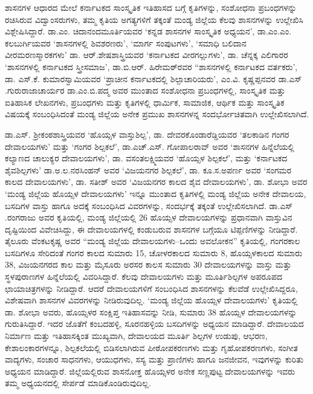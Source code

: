 ಶಾಸನಗಳ ಆಧಾರದ ಮೇಲೆ ಕರ್ನಾಟಕದ ಸಾಂಸ್ಕೃತಿಕ ಇತಿಹಾಸದ ಬಗ್ಗೆ ಕೃತಿಗಳನ್ನು, ಸಂಶೋಧನಾ ಪ್ರಬಂಧಗಳನ್ನು ರಚಿಸಿರುವ ವಿದ್ವಾಂಸರುಗಳು, ತಮ್ಮ ಕೃತಿಯ ಅಗತ್ಯಗಳಿಗೆ ತಕ್ಕಂತೆ ಮಂಡ್ಯ ಜಿಲ್ಲೆಯ ಕೆಲವು ಶಾಸನಗಳನ್ನು ಉಲ್ಲೇಖಿಸಿ ವಿಶ್ಲೇಷಿಸಿದ್ದಾರೆ. ಡಾ.ಎಂ. ಚಿದಾನಂದಮೂರ್ತಿಯವರ ‘ಕನ್ನಡ ಶಾಸನಗಳ ಸಾಂಸ್ಕೃತಿಕ ಅಧ್ಯಯನ’, ಡಾ.ಎಂ.ಎಂ. ಕಲಬುರ್ಗಿಯವರ ‘ಶಾಸನಗಳಲ್ಲಿ ಶಿವಶರಣರು’, ‘ಮಾರ್ಗ ಸಂಪುಟಗಳು’, ‘ಸಮಾಧಿ ಬಲಿದಾನ ವೀರಮರಣಸ್ಮಾರಕಗಳು’ ಡಾ. ಆರ್​.\break ಶೇಷಶಾಸ್ತ್ರಿಯವರ ‘ಕರ್ನಾಟಕದ ವೀರಗಲ್ಲುಗಳು’, ಡಾ. ಚೆನ್ನಕ್ಕ ಎಲಿಗಾರರ ‘ಶಾಸನಗಳಲ್ಲಿ ಕರ್ನಾಟಕದ ಸ್ತ್ರೀಸಮಾಜ’, ಡಾ.ಬಿ.ಆರ್​. ಹಿರೇಮಠ್​ರವರ “ಶಾಸನಗಳಲ್ಲಿ ಕರ್ನಾಟಕದ ವರ್ತಕರು’, ಡಾ. ಎಸ್​.ಕೆ. ಕುಮಾರಸ್ವಾಮಿಯವರ ‘ಪ್ರಾಚೀನ ಕರ್ನಾಟಕದಲ್ಲಿ ಶಿಲ್ಪಾಚಾರಿಯರು’, ಎಂ.ವಿ. ಕೃಷ್ಣಪ್ಪನವರ  ಡಾ.ಎಸ್​.ಗುರುರಾಜಾಚಾರ್ಯರ  ಡಾ.ಎಂ.ಬಿ.ಪದ್ಮ ಅವರ  ಮುಂತಾದ ಸಂಶೋಧನಾ ಪ್ರಬಂಧಗಳಲ್ಲಿ, ಸಾಂಸ್ಕೃತಿಕ ಮತ್ತು ಐತಿಹಾಸಿಕ ಲೇಖನಗಳು, ಪ್ರಬಂಧಗಳು ಮತ್ತು ಕೃತಿಗಳಲ್ಲಿ ಧಾರ್ಮಿಕ, ಸಾಮಾಜಿಕ, ಆರ್ಥಿಕ ಮತ್ತು ಸಾಂಸ್ಕೃತಿಕ ವಿಷಯಕ್ಕೆ ಸಂಬಂಧಿಸಿದಂತೆ ಮಂಡ್ಯ ಜಿಲ್ಲೆಯ ಅನೇಕ ಪ್ರಮುಖ ಶಾಸನಗಳನ್ನ ಸಂದರ್ಭೋಚಿತವಾಗಿ ಉಲ್ಲೇಖಿಸಲಾಗಿದೆ.

ಡಾ.ಎಸ್​. ಶ‍್ರೀಕಂಠಶಾಸ್ತ್ರಿಯವರ ‘ಹೊಯ್ಸಳ ವಾಸ್ತುಶಿಲ್ಪ’, ಡಾ. ದೇವರಕೊಂಡಾರೆಡ್ಡಿಯವರ ‘ತಲಕಾಡಿನ ಗಂಗರ ದೇವಾಲಯಗಳು’ ಮತ್ತು ‘ಗಂಗರ ಶಿಲ್ಪಕಲೆ’, ಡಾ.ಎಚ್​.ಎಸ್​. ಗೋಪಾಲರಾವ್​ ಅವರ ‘ಶಾಸನಗಳ ಹಿನ್ನೆಲೆಯಲ್ಲಿ ಕಲ್ಯಾಣದ ಚಾಲುಕ್ಯರ ದೇವಾಲಯಗಳು’, ಡಾ. ವಸಂತಲಕ್ಷ್ಮಿಯವರ ‘ಹೊಯ್ಸಳ ಶಿಲ್ಪಕಲೆ’, ಮತ್ತು ‘ಕರ್ನಾಟಕದ ಶೈವಶಿಲ್ಪಗಳು’ ಡಾ.ಅ.ಲ.ನರಸಿಂಹನ್​ ಅವರ ‘ವಿಜಯನಗರ ಶಿಲ್ಪಕಲೆ’, ಡಾ. ಕೂ.ಸ.ಅಪರ್ಣ ಅವರ ‘ಸಂಗಮರ ಕಾಲದ ದೇವಾಲಯಗಳು’, ಡಾ. ಸತೀಶ್​ ಅವರ ‘ವಿಜಯನಗರ ಕಾಲದ ಶೈವ ದೇವಾಲಯಗಳು’, ಡಾ. ಶೋಭಾ ಅವರ ‘ಮಂಡ್ಯ ಜಿಲ್ಲೆಯ ಹೊಯ್ಸಳ ದೇವಾಲಯಗಳು’ ಇನ್ನೂ ಮುಂತಾದ ಕೃತಿಗಳಲ್ಲಿ ಮಂಡ್ಯ ಜಿಲ್ಲೆಯ ಅನೇಕ ದೇವಾಲಯ, ಬಸದಿಗಳ ವಾಸ್ತು ಹಾಗೂ ಅದಕ್ಕೆ ಸಂಬಂಧಿಸಿದ ವಿವರಗಳನ್ನು, ಸಂದರ್ಭಕ್ಕೆ ತಕ್ಕಂತೆ ಉಲ್ಲೇಖಿಸಲಾಗಿದೆ. ಡಾ.ಎಸ್​.ರಂಗರಾಜು ಅವರ  ಕೃತಿಯಲ್ಲಿ, ಮಂಡ್ಯ ಜಿಲ್ಲೆಯಲ್ಲಿ 26 ಹೊಯ್ಸಳ ದೇವಾಲಯಗಳನ್ನು ಪ್ರಧಾನವಾಗಿ ವಾಸ್ತುವಿನ ದೃಷ್ಟಿಯಿಂದ ವಿವೇಚಿಸಿದ್ದು, ಈ ದೇವಾಲಯಗಳಲ್ಲಿ ಕಂಡುಬರುವ ಶಾಸನಗಳ ಬಗ್ಗೆಯೂ ಟಿಪ್ಪಣಿಗಳನ್ನು ನೀಡಿದ್ದಾರೆ. ತೈಲೂರು ವೆಂಕಟಕೃಷ್ಣ ಅವರ “ಮಂಡ್ಯ ಜಿಲ್ಲೆಯ ದೇವಾಲಯಗಳು–ಒಂದು ಅವಲೋಕನ” ಕೃತಿಯಲ್ಲಿ, ಗಂಗರಕಾಲ ಬಸದಿಗಳೂ ಸೇರಿದಂತೆ ಗಂಗರ ಕಾಲದ ಸುಮಾರು 15, ಚೋಳರಕಾಲದ ಸುಮಾರು 8, ಹೊಯ್ಸಳಕಾಲದ ಸುಮಾರು 38, ವಿಜಯನಗರದ ಕಾಲ ಮತ್ತು ಮೈಸೂರು ಅರಸರ ಕಾಲಸ ಸುಮಾರು 30 ದೇವಾಲಯಗಳನ್ನು ವಾಸ್ತು ಮತ್ತು ಸ್ಥಳಪುರಾಣಗಳ ಹಿನ್ನೆಲೆಯಲ್ಲಿ ವಿವರಿಸಿದ್ದಾರೆ. ಕೆಲವು ದೇವಾಲಯಗಳು ಮತ್ತು ಮೂರ್ತಿಶಿಲ್ಪಗಳ ಅಪರೂಪದ ಛಾಯಾಚಿತ್ರಗಳನ್ನು ನೀಡಿದ್ದಾರೆ. ಆದರೆ ದೇವಾಲಯಗಳಿಗೆ ಸಂಬಂಧಿಸಿದ ಶಾಸನಗಳನ್ನು ಕೆಲವೆಡೆ ಉಲ್ಲೇಖಿಸಿದ್ದರೂ, ವಿಶೇಷವಾಗಿ ಶಾಸನಗಳ ವಿವರಗಳನ್ನು ನೀಡಿರುವುದಿಲ್ಲ. ‘ಮಂಡ್ಯ ಜಿಲ್ಲೆಯ ಹೊಯ್ಸಳ ದೇವಾಲಯಗಳು’ ಕೃತಿಯಲ್ಲಿ ಡಾ. ಶೋಭಾ ಅವರು, ಹೊಯ್ಸಳರ ಸಂಕ್ಷಿಪ್ತ ಇತಿಹಾಸವನ್ನು ನೀಡಿ, ಸುಮಾರು 38 ಹೊಯ್ಸಳ ದೇವಾಲಯಗಳನ್ನು ಗುರುತಿಸಿದ್ದಾರೆ. ಇದರ ಜೊತೆಗೆ ಕಂಬದಹಳ್ಳಿ, ಸೂರನಹಳ್ಳಿಯ ಬಸದಿಗಳನ್ನು ಅಧ್ಯಯನ ಮಾಡಿದ್ದಾರೆ. ದೇವಾಲಯದ ನಿರ್ಮಾಣ ಮತ್ತು ಇತಿಹಾಸಕ್ಕಿಂತ ಮುಖ್ಯವಾಗಿ, ದೇವಾಲಯದ ಮೂರ್ತಿ ಶಿಲ್ಪಗಳ ಉಡುಪು, ಆಭರಣ, ಕೇಶಾಲಂಕಾರಗಳನ್ನೂ, ಶಿಲ್ಪಕಲೆಯಲ್ಲಿ ಬಿಡಿಸಲಾಗಿರುವ ಪೀಠೋಪಕರಣಗಳು ಮತ್ತು ಗೃಹೋಪಕರಣಗಳು, ಸಂಗೀತ ವಾದ್ಯಗಳು, ಸಂಚಾರ ಸಾಧನಗಳು, ಆಯುಧಗಳು, ಸಸ್ಯ ಮತ್ತು ಪ್ರಾಣಿಗಳು ಹಾಗೂ ಜನಜೀವನ, ಇವುಗಳನ್ನು ಕುರಿತು ಅಧ್ಯಯನ ಮಾಡಿದ್ದಾರೆ. ಜಿಲ್ಲೆಯಲ್ಲಿರುವ ಶಾಸನೋಕ್ತ ಹೊಯ್ಸಳರ ಅನೇಕ ಸಣ್ಣಪುಟ್ಟ ದೇವಾಲಯಗಳನ್ನು ಇವರು ತಮ್ಮ ಅಧ್ಯಯನದಲ್ಲಿ ಸೇರ್ಪಡೆ ಮಾಡಿಕೊಂಡಿರುವುದಿಲ್ಲ.

